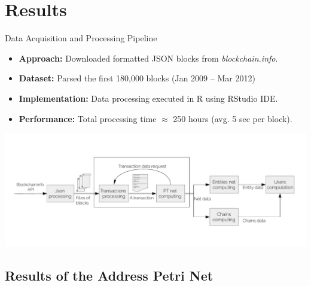 \documentclass{beamer}
\begin{document}
\section{Results}

\begin{frame}{Data Acquisition and Processing Pipeline}
    \footnotesize
    \begin{itemize}
        \item \textbf{Approach:} Downloaded formatted JSON blocks from \textit{blockchain.info}.
        \item \textbf{Dataset:} Parsed the first 180,000 blocks (Jan 2009 -- Mar 2012)
        \item \textbf{Implementation:} Data processing executed in R using RStudio IDE.
        \item \textbf{Performance:} Total processing time $\approx$ 250 hours (avg. 5 sec per block).
    \end{itemize}
    \vspace{0.3cm}
    \centering
    \includegraphics[width=1\linewidth]{diagram}
\end{frame}

\subsection{Results of the Address Petri Net}
\end{document}

